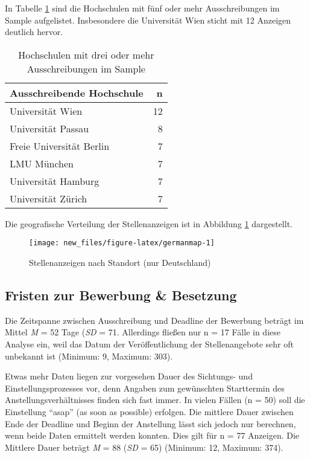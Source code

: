 \documentclass[
]{article}
\begin{document}
In Tabelle \ref{tab:institutions} sind die Hochschulen mit fünf oder mehr Ausschreibungen im Sample aufgelistet. Insbesondere die Universität Wien sticht mit 12 Anzeigen deutlich hervor.

\begin{table}[H]

\caption{\label{tab:institutions}Hochschulen mit drei oder mehr Ausschreibungen im Sample}
\centering
\begin{tabular}[t]{l|r}
\hline
Ausschreibende Hochschule & n\\
\hline
Universität Wien & 12\\
\hline
Universität Passau & 8\\
\hline
Freie Universität Berlin & 7\\
\hline
LMU München & 7\\
\hline
Universität Hamburg & 7\\
\hline
Universität Zürich & 7\\
\hline
\end{tabular}
\end{table}

Die geografische Verteilung der Stellenanzeigen ist in Abbildung \ref{fig:germanmap} dargestellt.

\begin{figure}

\texttt{[image: new\_files/figure-latex/germanmap-1]} \hfill{}

\caption{Stellenanzeigen nach Standort (nur Deutschland)}\label{fig:germanmap}
\end{figure}

\hypertarget{fristen-zur-bewerbung-besetzung}{%
\subsection{Fristen zur Bewerbung \& Besetzung}\label{fristen-zur-bewerbung-besetzung}}

Die Zeitspanne zwischen Ausschreibung und Deadline der Bewerbung beträgt im Mittel \emph{M} = 52 Tage (\emph{SD} = 71. Allerdings fließen nur n = 17 Fälle in diese Analyse ein, weil das Datum der Veröffentlichung der Stellenangebote sehr oft unbekannt ist (Minimum: 9, Maximum: 303).

Etwas mehr Daten liegen zur vorgesehen Dauer des Sichtungs- und Einstellungsprozesses vor, denn Angaben zum gewünschten Starttermin des Anstellungsverhältnisses finden sich fast immer. In vielen Fällen (n = 50) soll die Einstellung ``asap'' (as soon as possible) erfolgen. Die mittlere Dauer zwischen Ende der Deadline und Beginn der Anstellung lässt sich jedoch nur berechnen, wenn beide Daten ermittelt werden konnten. Dies gilt für n = 77 Anzeigen. Die Mittlere Dauer beträgt \emph{M} = 88 (\emph{SD} = 65) (Minimum: 12, Maximum: 374).
\end{document}
